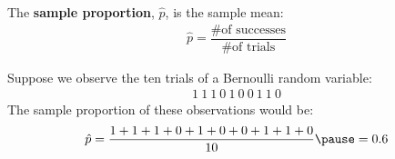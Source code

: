 \documentclass{beamer}
\begin{document}
\begin{frame}
  \begin{definition}
    The \textbf{sample proportion}, $\hat{p}$, is the sample mean:
    \begin{equation*}
      \begin{aligned}
        \hat{p} = \dfrac{\text{\# of successes}}{\text{\# of trials}}
      \end{aligned}
    \end{equation*}
  \end{definition}\pause

  \begin{example}
    Suppose we observe the ten trials of a Bernoulli random variable:
    \begin{equation*}
      \begin{aligned}
        1~1~1~0~1~0~0~1~1~0
      \end{aligned}
    \end{equation*}\pause
    The sample proportion of these observations would be:
    \begin{equation*}
      \begin{aligned}
        \hat{p} = \dfrac{1+1+1+0+1+0+0+1+1+0}{10}\pause = 0.6
      \end{aligned}
    \end{equation*}
  \end{example}
\end{frame}
\end{document}
